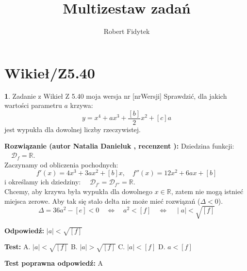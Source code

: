 \documentclass[12pt, a4paper]{article}
\title{Multizestaw zadań}
\author{Robert Fidytek}
\date{}
\theoremstyle{definition} %
\newtheorem{zad}{}
\newcommand{\kategoria}[1]{\section{#1}} %
\newcommand{\zadStart}[1]{\begin{zad}#1\newline} %
\newcommand{\zadStop}{\end{zad}}   %
\newcommand{\rozwStart}[2]{\noindent \textbf{Rozwiązanie (autor #1 , recenzent #2): }\newline} %
\newcommand{\rozwStop}{\newline}                                            %
\newcommand{\odpStart}{\noindent \textbf{Odpowiedź:}\newline}    %
\newcommand{\odpStop}{\newline}                                             %
\newcommand{\testStart}{\noindent \textbf{Test:}\newline} %
\newcommand{\testStop}{\newline} %
\newcommand{\kluczStart}{\noindent \textbf{Test poprawna odpowiedź:}\newline} %
\newcommand{\kluczStop}{\newline} %
\begin{document}
\maketitle

\kategoria{Wikieł/Z5.40}

\zadStart{Zadanie z Wikieł Z 5.40 moja wersja nr [nrWersji]}
Sprawdzić, dla jakich wartości parametru $a$ krzywa:
$$y = x^4 + ax^3 + \frac{[b]}{2}x^2 + [c]a$$
jest wypukła dla dowolnej liczby rzeczywistej.
\zadStop

\rozwStart{Natalia Danieluk}{}
Dziedzina funkcji: $\quad \mathcal{D}_f=\mathbb{R}$. \\
Zaczynamy od obliczenia pochodnych: \\
$$f'(x) = 4x^3 + 3ax^2 + [b]x, \quad f''(x) = 12x^2 + 6ax + [b]$$
i określamy ich dziedziny: $\quad \mathcal{D}_{f'}=\mathcal{D}_{f''}=\mathbb{R}$. \\
Chcemy, aby krzywa była wypukła dla dowolnego $x \in \mathbb{R}$, zatem nie mogą istnieć miejsca zerowe. Aby tak się stalo delta nie może mieć rozwiązań ($\Delta < 0$).
$$\Delta = 36a^2 - [e] < 0 \quad\Leftrightarrow\quad a^2 < [f] \quad\Leftrightarrow\quad \mid a \mid < \sqrt{[f]}$$
\rozwStop

\odpStart
$\mid a \mid < \sqrt{[f]}$
\odpStop

\testStart
A. $\mid a \mid < \sqrt{[f]}$
B. $\mid a \mid > \sqrt{[f]}$
C. $\mid a \mid < [f]$
D. $a < [f]$
\testStop

\kluczStart
A
\kluczStop
\end{document}
